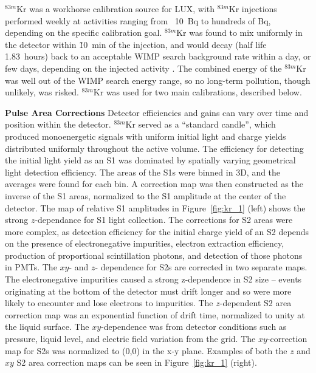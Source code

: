 $^{83m}$Kr was a workhorse calibration source for \ac{LUX}, with $^{83m}$Kr injections performed weekly at activities ranging from ~10~Bq to hundreds of Bq, depending on the specific calibration goal. $^{83m}$Kr was found to mix uniformly in the detector within \~10~min of the injection, and would decay (half life 1.83~hours) back to an acceptable \ac{WIMP} search background rate within a day, or few days, depending on the injected activity \cite{LUXKr}. The combined energy of the $^{83m}$Kr was well out of the \ac{WIMP} search energy range, so no long-term pollution, though unlikely, was risked. $^{83m}$Kr was used for two main calibrations, described below.

\textbf{Pulse Area Corrections} Detector efficiencies and gains can vary over time and position within the detector. $^{83m}$Kr served as a ``standard candle'', which produced monoenergetic signals with uniform initial light and charge yields distributed uniformly throughout the active volume. The efficiency for detecting the initial light yield as an S1 was dominated by spatially varying geometrical light detection efficiency. The areas of the S1s were binned in 3D, and the averages were found for each bin. A correction map was then constructed as the inverse of the S1 areas, normalized to the S1 amplitude at the center of the detector. The map of relative S1 amplitudes in Figure~\ref{fig:kr_1} (left) shows the strong $z$-dependance for S1 light collection. The corrections for S2 areas were more complex, as detection efficiency for the initial charge yield of an S2 depends on the presence of electronegative impurities, electron extraction efficiency, production of proportional scintillation photons, and detection of those photons in \ac{PMT}s. The $xy$- and $z$- dependence for S2s are corrected in two separate maps. The electronegative impurities caused a strong z-dependence in S2 size -- events originating at the bottom of the detector must drift longer and so were more likely to encounter and lose electrons to impurities. The $z$-dependent S2 area correction map was an exponential function of drift time, normalized to unity at the liquid surface. The $xy$-dependence was from detector conditions such as pressure, liquid level, and electric field variation from the grid. The $xy$-correction map for S2s was normalized to (0,0) in the x-y plane. Examples of both the $z$ and $xy$ S2 area correction maps can be seen in Figure~\ref{fig:kr_1} (right).


